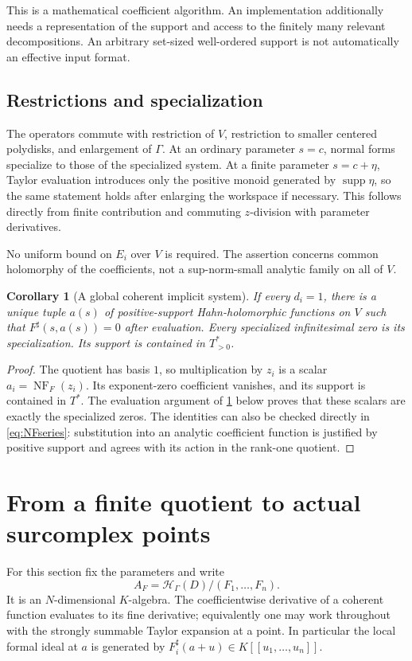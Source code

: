 \documentclass[11pt,letterpaper]{article}
\newtheorem{corollary}[theorem]{Corollary}
\theoremstyle{definition}
\theoremstyle{remark}
\newcommand{\HH}{\mathcal H}
\newcommand{\sh}{^{\sharp}}
\newcommand{\supp}{\operatorname{supp}}
\newcommand{\NF}{\operatorname{NF}}
\numberwithin{equation}{section}
\begin{document}
This is a mathematical coefficient algorithm. An implementation additionally needs a representation of the support and access to the finitely many relevant decompositions. An arbitrary set-sized well-ordered support is not automatically an effective input format.

\subsection{Restrictions and specialization}
The operators commute with restriction of $V$, restriction to smaller centered polydisks, and enlargement of $\Gamma$. At an ordinary parameter $s=c$, normal forms specialize to those of the specialized system. At a finite parameter $s=c+\eta$, Taylor evaluation introduces only the positive monoid generated by $\supp\eta$, so the same statement holds after enlarging the workspace if necessary. This follows directly from finite contribution and commuting $z$-division with parameter derivatives.

No uniform bound on $E_i$ over $V$ is required. The assertion concerns common holomorphy of the coefficients, not a sup-norm-small analytic family on all of $V$.

\begin{corollary}[A global coherent implicit system]\label{cor:implicit}
If every $d_i=1$, there is a unique tuple $a(s)$ of positive-support Hahn-holomorphic functions on $V$ such that $F\sh(s,a(s))=0$ after evaluation. Every specialized infinitesimal zero is its specialization. Its support is contained in $T^*_{>0}$.
\end{corollary}
\begin{proof}
The quotient has basis $1$, so multiplication by $z_i$ is a scalar $a_i=\NF_F(z_i)$. Its exponent-zero coefficient vanishes, and its support is contained in $T^*$. The evaluation argument of \cref{sec:points} below proves that these scalars are exactly the specialized zeros. The identities can also be checked directly in \eqref{eq:NFseries}: substitution into an analytic coefficient function is justified by positive support and agrees with its action in the rank-one quotient.
\end{proof}

\section{From a finite quotient to actual surcomplex points}\label{sec:points}
For this section fix the parameters and write
\[
 A_F=\HH_\Gamma(D)/(F_1,\ldots,F_n).
\]
It is an $N$-dimensional $K$-algebra. The coefficientwise derivative of a coherent function evaluates to its fine derivative; equivalently one may work throughout with the strongly summable Taylor expansion at a point. In particular the local formal ideal at $a$ is generated by $F_i\sh(a+u)\in K[[u_1,\ldots,u_n]]$.
\end{document}
